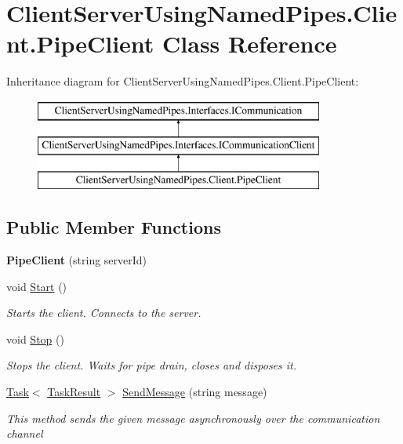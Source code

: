 \hypertarget{class_client_server_using_named_pipes_1_1_client_1_1_pipe_client}{}\section{Client\+Server\+Using\+Named\+Pipes.\+Client.\+Pipe\+Client Class Reference}
\label{class_client_server_using_named_pipes_1_1_client_1_1_pipe_client}
Inheritance diagram for Client\+Server\+Using\+Named\+Pipes.\+Client.\+Pipe\+Client\+:\begin{figure}[H]
\begin{center}
\leavevmode
\includegraphics[height=3.000000cm]{class_client_server_using_named_pipes_1_1_client_1_1_pipe_client}
\end{center}
\end{figure}
\subsection*{Public Member Functions}
\begin{DoxyCompactItemize}
\item 
\mbox{\label{class_client_server_using_named_pipes_1_1_client_1_1_pipe_client_aa1a9a481e206f60bbc8bf288f33b2622}} 
{\bfseries Pipe\+Client} (string server\+Id)
\item 
void \hyperlink{class_client_server_using_named_pipes_1_1_client_1_1_pipe_client_a0bb2855199630657cdf070e3c4275b51}{Start} ()
\begin{DoxyCompactList}\small\item\em Starts the client. Connects to the server. \end{DoxyCompactList}\item 
void \hyperlink{class_client_server_using_named_pipes_1_1_client_1_1_pipe_client_a9d442b0b2a19c3d460185a8bb27e36e9}{Stop} ()
\begin{DoxyCompactList}\small\item\em Stops the client. Waits for pipe drain, closes and disposes it. \end{DoxyCompactList}\item 
\hyperlink{class_system_1_1_threading_1_1_tasks_1_1_task}{Task}$<$ \hyperlink{class_client_server_using_named_pipes_1_1_utilities_1_1_task_result}{Task\+Result} $>$ \hyperlink{class_client_server_using_named_pipes_1_1_client_1_1_pipe_client_af1b876c52ee2cfc920dcf56ea7434839}{Send\+Message} (string message)
\begin{DoxyCompactList}\small\item\em This method sends the given message asynchronously over the communication channel \end{DoxyCompactList}\end{DoxyCompactItemize}


